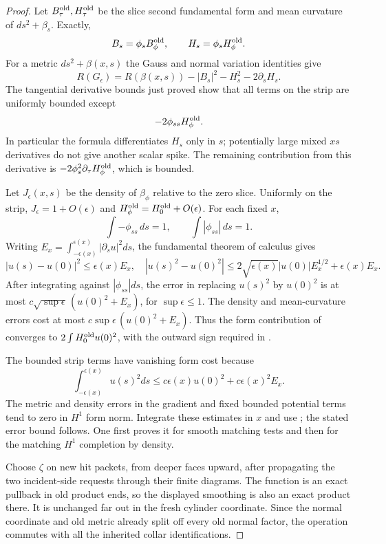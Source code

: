 \begin{proof}
Let $B^{\rm old}_\tau,H^{\rm old}_\tau$ be the slice second
fundamental form and mean curvature of $ds^2+\beta_s$.  Exactly,
\[
 B_s=\phi_sB^{\rm old}_{\phi},\qquad
 H_s=\phi_sH^{\rm old}_{\phi}.
\]
For a metric $ds^2+\beta(x,s)$ the Gauss and normal variation
identities give
\[
 R(G_\epsilon)=R(\beta(x,s))-|B_s|^2-H_s^2-2\partial_sH_s.
\]
The tangential derivative bounds just proved show that all terms on
the strip are uniformly bounded except
\begin{equation}\label{regular:spike}
 -2\phi_{ss}H^{\rm old}_{\phi}.
\end{equation}
In particular the formula differentiates $H_s$ only in $s$;
potentially large mixed $xs$ derivatives do not give another scalar
spike.  The remaining contribution from this derivative is
$-2\phi_s^2\partial_\tau H^{\rm old}_\phi$, which is bounded.

Let $J_\epsilon(x,s)$ be the density of $\beta_\phi$ relative to
the zero slice.  Uniformly on the strip,
$J_\epsilon=1+O(\epsilon)$ and
$H^{\rm old}_\phi=H^{\rm old}_0+O(\epsilon)$.
For each fixed $x$,
\[
 \int-\phi_{ss}\,ds=1,\qquad
 \int|\phi_{ss}|\,ds=1.
\]
Writing $E_x=\int_{-\epsilon(x)}^{\epsilon(x)}|\partial_su|^2ds$,
the fundamental theorem of calculus gives
\[
 |u(s)-u(0)|^2\le\epsilon(x)E_x,
 \quad
 |u(s)^2-u(0)^2|
 \le2\sqrt{\epsilon(x)}|u(0)|E_x^{1/2}+\epsilon(x)E_x.
\]
After integrating against $|\phi_{ss}|ds$, the error in replacing
$u(s)^2$ by $u(0)^2$ is at most
$c\sqrt{\sup\epsilon}\,(u(0)^2+E_x)$, for $\sup\epsilon\le1$.
The density and mean-curvature errors cost at most
$c\sup\epsilon\,(u(0)^2+E_x)$.  Thus the form contribution of
 converges to
$2\int H^{\rm old}_0u(0)^2$, with the outward sign required in
.

The bounded strip terms have vanishing form cost because
\[
 \int_{-\epsilon(x)}^{\epsilon(x)}u(s)^2ds
 \le c\epsilon(x)u(0)^2+c\epsilon(x)^2E_x.
\]
The metric and density errors in the gradient and fixed bounded
potential terms tend to zero in $H^1$ form norm.  Integrate these
estimates in $x$ and use ; the stated error bound
follows.  One first proves it for smooth matching tests and then for
the matching $H^1$ completion by density.

Choose $\zeta$ on new hit packets, from deeper faces upward, after
propagating the two incident-side requests through their finite
diagrams.  The function is an exact pullback in old product ends, so
the displayed smoothing is also an exact product there.  It is
unchanged far out in the fresh cylinder coordinate.  Since the normal
coordinate and old metric already split off every old normal factor,
the operation commutes with all the inherited collar identifications.
\end{proof}


